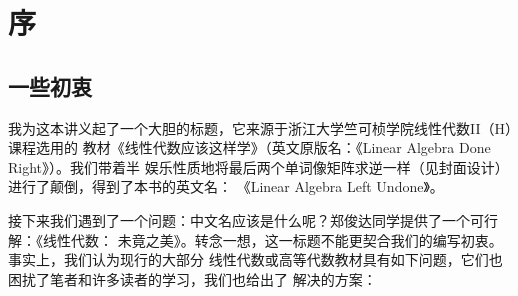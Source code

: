 \chapter*{序}

\section*{一些初衷}
我为这本讲义起了一个大胆的标题，它来源于浙江大学竺可桢学院线性代数II（H）课程选用的
教材《线性代数应该这样学》（英文原版名：《Linear Algebra Done Right》）。我们带着半
娱乐性质地将最后两个单词像矩阵求逆一样（见封面设计）进行了颠倒，得到了本书的英文名：
《Linear Algebra Left Undone》。

接下来我们遇到了一个问题：中文名应该是什么呢？郑俊达同学提供了一个可行解：《线性代数：
未竟之美》。转念一想，这一标题不能更契合我们的编写初衷。事实上，我们认为现行的大部分
线性代数或高等代数教材具有如下问题，它们也困扰了笔者和许多读者的学习，我们也给出了
解决的方案：
